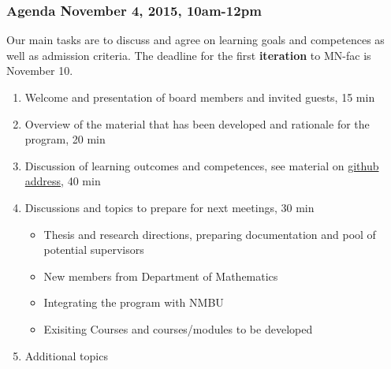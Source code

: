 \documentclass{beamer}
\begin{document}
\begin{frame}
\frametitle{Agenda November 4, 2015, 10am-12pm}

\begin{block}{}
Our main tasks are to discuss and agree on learning goals and competences as well as admission criteria. The deadline for the first \textbf{iteration} to MN-fac is November 10. 

\begin{enumerate}
\item Welcome and presentation of board members and invited guests, 15 min

\item Overview of the material that has been developed and rationale for the program, 20 min

\item Discussion of learning outcomes and competences, see material on \href{{http://mhjensen.github.io/CPMLS/doc/pub/Masterprogram/html/Masterprogram.html}}{github address}, 40 min

\item Discussions and topics to prepare for next meetings, 30 min
\begin{itemize}

  \item Thesis and research directions, preparing documentation and pool of potential supervisors

  \item New members from Department of Mathematics

  \item Integrating the program with NMBU

  \item Exisiting Courses and courses/modules to be developed 

\end{itemize}

\noindent
\item Additional topics
\end{enumerate}

\noindent
\end{block}
\end{frame}
\end{document}
